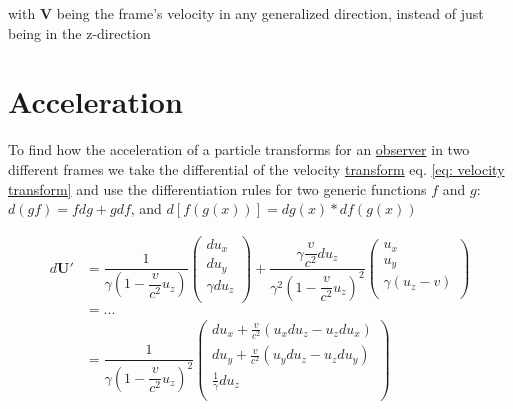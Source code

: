 with $\mathbf{V}$ being the frame's velocity in any generalized direction, instead of just being in the z-direction

\section{Acceleration}

To find how the acceleration of a particle transforms for an \hyperlink{def-observer}{observer} in two different frames we take the differential of the velocity \hyperlink{def-transform}{transform} eq. \eqref{eq: velocity transform} and use the differentiation rules for two generic functions $f$ and $g$: $d(gf)=f dg+g df$, and $d[f(g(x))]= dg(x) * df(g(x))$

\begin{equation}
	\begin{aligned}
		d\mathbf{U}{'} & = \dfrac{1}{{\gamma}\left(1- \dfrac{v}{c^2} {{u}_{z}}\right) }
		\begin{pmatrix}
			d{{u}_{x}}          \\
			d{{u}_{y}}          \\
			{\gamma} d{{u}_{z}} \\
		\end{pmatrix}
		+ \dfrac{{\gamma} \dfrac{v}{c^2} d{{u}_{z}}}{{\gamma}^2\left(1- \dfrac{v}{c^2} {{u}_{z}}\right)^2 }
		\begin{pmatrix}
			{{u}_{x}}                             \\
			{{u}_{y}}                             \\
			{\gamma} \left( {{u}_{z}} - v \right) \\
		\end{pmatrix}                                           \\
		             & = ...                                                      \\
		             & = \dfrac{1}{{\gamma}\left(1- \dfrac{v}{c^2} {{u}_{z}}\right)^2 }
		\begin{pmatrix}
			d{{u}_{x}} + \frac{v}{c^2}( {{u}_{x}} d{{u}_{z}} - {{u}_{z}} d{{u}_{x}}) \\
			d{{u}_{y}} + \frac{v}{c^2}( {{u}_{y}} d{{u}_{z}} - {{u}_{z}} d{{u}_{y}}) \\
			\frac{1}{{\gamma}} d{{u}_{z}}                    \\
		\end{pmatrix}
	\end{aligned}
\end{equation}

